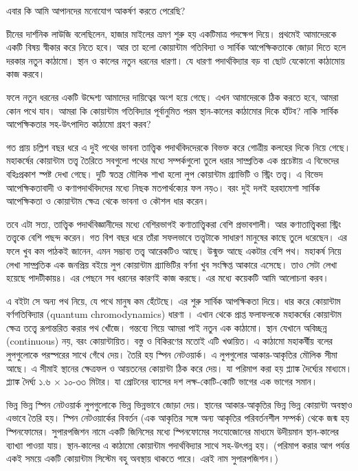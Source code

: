 \documentclass[
  letterpaper,
  DIV=11,
  numbers=noendperiod]{scrreprt}
\begin{document}
এবার কি আমি আপানদের মনোযোগ আকর্ষণ করতে পেরেছি?

চীনের দার্শনিক লাউজি বলেছিলেন, হাজার মাইলের ভ্রমণ শুরু হয় একটিমাত্র পদক্ষেপ
দিয়ে। প্রথমেই আমাদেরকে একটি বিষয় স্বীকার করে নিতে হবে। আর তা হলো কোয়ান্টাম
গতিবিদ্যা ও সার্বিক আপেক্ষিকতাকে জোড়া দিতে হলে দরকার নতুন কাঠামো। স্থান ও
কালের নতুন ধরনের ধারণা। যে ধারণা পদার্থবিদ্যার বড় বা ছোট যেকোনো কাঠামোয় কাজ
করবে।

ফলে নতুন ধরনের একটি উদ্দেশ্য আমাদের দায়িত্বের অংশ হয়ে গেছে। এখন আমাদেরকে ঠিক
করতে হবে, আমরা কোন পথে যাব। আমরা কি কোয়ান্টাম গতিবিদ্যার পূর্বানুমিত পরম
স্থান-কালের কাঠামোর দিকে হাঁটব? নাকি সার্বিক আপেক্ষিকতার সহ-উৎপাদিত কাঠামো
গ্রহণ করব?

গত প্রায় চল্লিশ বছর ধরে এ দুই পথের ভাবনা তাত্ত্বিক পদার্থবিদদেরকে বিভক্ত করে
গোত্রীয় কলহের দিকে নিয়ে গেছে। মহাকর্ষের কোয়ান্টাম তত্ত্ব তৈরিতে সবগুলো পথের
মধ্যে সম্পর্কগুলো তুলে ধরার সাম্প্রতিক এক প্রচেষ্টায় এ বিভেদের বহিঃপ্রকাশ স্পষ্ট
দেখা গেছে। দুটি স্বতন্ত্র মৌলিক শাখা হলো লুপ কোয়ান্টাম গ্র্যাভিটি ও স্ট্রিং তত্ত্ব।
এ বিভেদ আপেক্ষিকতাবাদী ও কণাপদার্থবিদদের মধ্যে নিছক মতপার্থক্যের ফল নয়৩। বরং
দুই দলই হরহামেশা সার্বিক আপেক্ষিকতা ও কোয়ান্টাম ক্ষেত্র থেকে ভাবনা ও কৌশল ধার
করেন।

তবে এটা সত্য, তাত্ত্বিক পদার্থবিজ্ঞানীদের মধ্যে বেশিরভাগই কণাতাত্ত্বিকরা বেশি
প্রভাবশালী। আর কণাতাত্ত্বিকরা স্ট্রিং তত্ত্বকে বেশি পছন্দ করেন। গত বিশ বছর ধরে
তাঁরা সফলভাবে তত্ত্বটাকে সাধারণ মানুষের কাছে তুলে ধরেছেন। এর ফলে খুব কম পাঠকই
জানেন, এমন সম্ভাব্য তত্ত্ব আরেকটিও আছে। উন্মুক্ত আছে একটার বেশি পথ। মহাকর্ষ নিয়ে
লেখা সাম্প্রতিক এক জনপ্রিয় বইয়ে লুপ কোয়ান্টাম গ্র্যাভিটির বর্ণনা খুব সংক্ষিপ্ত
আকারে এসেছে। তাও সেটা লেখা হয়েছে পাদটীকায়৪। এর পেছনে সব ধরনের কারণই কাজ
করছে। এর মধ্যে কয়েকটি আমি আলোচনা করব।

এ বইটা সে অন্য পথ নিয়ে, যে পথে মানুষ কম হেঁটেছে। এর শুরু সার্বিক আপক্ষিকতা
দিয়ে। ধার করে কোয়ান্টাম বর্ণগতিবিদ্যার (quantum chromodynamics) ধারণা ।
এখান থেকে প্রাপ্ত ফলাফলকে মহাকর্ষের কোয়ান্টাম ক্ষেত্র তত্ত্বে রূপান্তরিত করার পথ
খোঁজে। গন্তব্যে গিয়ে আমরা পাই নতুন এক কাঠামো। স্থান যেখানে অবিচ্ছন্ন
(continuous) নয়, বরং কোয়ান্টায়িত। বস্তু ও বিকিরণের মতোই এটি খণ্ডায়িত। এ
কাঠামো মহাকর্ষীয় বলের লুপগুলোকে পরস্পরের সাথে গেঁথে দেয়। তৈরি হয় স্পিন
নেটওয়ার্ক। এ লুপগুলোর আকার-আকৃতির মৌলিক সীমা আছে। এ সীমাই স্থানের ক্ষেত্রফল ও
আয়তনের কোয়ান্টা ঠিক করে দেয়। যা পরিমাপ করা হয় প্ল্যাঙ্ক দৈর্ঘ্যের মাধ্যমে।
প্ল্যাঙ্ক দৈর্ঘ্য ১.৬ × ১০-৩৩ মিটার। যা প্রোটনের ব্যাসের দশ লক্ষ-কোটি-কোটি ভাগের
এক ভাগের সমান।

ভিন্ন ভিন্ন স্পিন নেটওয়ার্ক লুপগুলোকে ভিন্ন ভিন্নভাবে জোড়া দেয়। স্থানের
আকার-আকৃতির ভিন্ন ভিন্ন কোয়ান্টা অবস্থাও এভাবে তৈরি হয়। স্পিন নেটওয়ার্কের
বিবর্তন (এক আকৃতির সঙ্গে অন্য আকৃতির পরিবর্তনশীল সম্পর্ক) থেকে জন্ম হয় স্পিনফোমের।
সুপারপজিশন নামে একটি জিনিসের মধ্যে স্পিনফোমের সংযোজোনের মাধ্যমে উদীয়মান
স্থান-কালের ব্যাখ্যা পাওয়া যায়। স্থান-কালের এ কাঠামো কোয়ান্টাম পদার্থবিদ্যার
সাথে সহ-উৎপন্ন হয়। (পরিমাপ করার আগ পর্যন্ত একই সময়ে একটি কোয়ান্টাম সিস্টেম বহু
অবস্থায় থাকতে পারে। এরই নাম সুপারপজিশন।)
\end{document}
